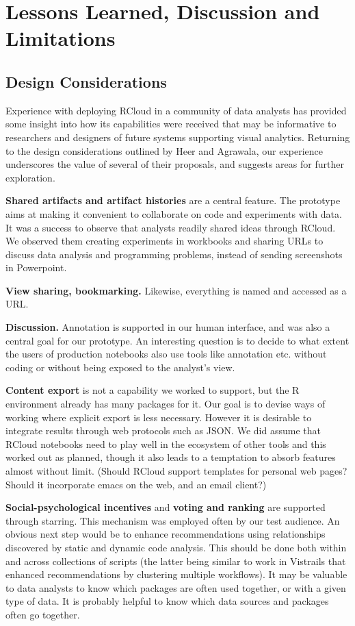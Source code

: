 \section{Lessons Learned, Discussion and Limitations}

\subsection{Design Considerations}

Experience with deploying RCloud in a community of data analysts
has provided some insight into how its capabilities were received
that may be informative to researchers and designers of future systems
supporting visual analytics.
Returning to the design considerations outlined by Heer and Agrawala,
our experience underscores the value of several of their proposals,
and suggests areas for further exploration.

{\bf Shared artifacts and artifact histories} are a central feature.
The prototype aims at making it convenient to collaborate on code
and experiments with data. It was a success to observe that analysts
readily shared ideas through RCloud. We observed them creating experiments
in workbooks and sharing URLs to discuss data analysis and programming
problems, instead of sending screenshots in Powerpoint.

{\bf View sharing, bookmarking.} Likewise, everything is named
and accessed as a URL.

{\bf Discussion.} Annotation is supported in our human interface,
and was also a central goal for our prototype.
An interesting question is to decide to what extent the users of
production notebooks also use tools like annotation etc. without coding
or without being exposed to the analyst's view.

{\bf Content export} is not a capability we worked to support,
but the R environment already has many packages for it.
Our goal is to devise ways of working where explicit export is
less necessary. However it is desirable to integrate results
through web protocols such as JSON. We did assume that RCloud
notebooks need to play well in the ecosystem of other tools
and this worked out as planned, though it also leads to a temptation
to absorb features almost without limit. (Should RCloud support
templates for personal web pages? Should it incorporate emacs
on the web, and an email client?)

{\bf Social-psychological incentives} and {\bf voting and ranking}
are supported through starring. This mechanism was employed often
by our test audience. An obvious next step would be to enhance
recommendations using relationships discovered by static and
dynamic code analysis. This should be done both within and across
collections of scripts (the latter being similar to work in Vistrails
that enhanced recommendations by clustering multiple workflows).
It may be valuable to data analysts to know which packages are often
used together, or with a given type of data. It is probably helpful
to know which data sources and packages often go together.

